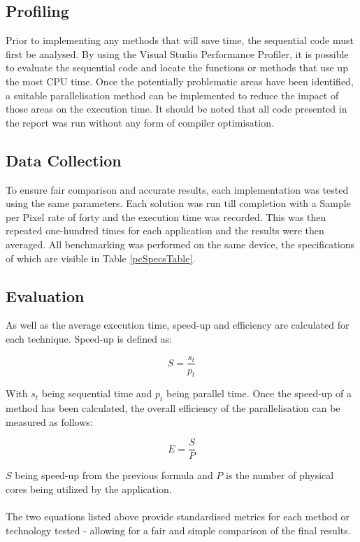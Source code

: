 \documentclass[journal,transmag]{IEEEtran}
\begin{document}
	\subsection{Profiling}
		Prior to implementing any methods that will save time, the sequential code must first be analysed. By using the Visual Studio Performance Profiler, it is possible to evaluate the sequential code and locate the functions or methods that use up the most CPU time. Once the potentially problematic areas have been identified, a suitable parallelisation method can be implemented to reduce the impact of those areas on the execution time. It should be noted that all code presented in the report was run without any form of compiler optimisation.
		
	\subsection{Data Collection}
		To ensure fair comparison and accurate results, each implementation was tested using the same parameters. Each solution was run till completion with a Sample per Pixel rate of forty and the execution time was recorded. This was then repeated one-hundred times for each application and the results were then averaged. All benchmarking was performed on the same device, the specifications of which are visible in Table \ref{pcSpecsTable}. 
		
	\subsection{Evaluation}
		As well as the average execution time, speed-up and efficiency are calculated for each technique. Speed-up is defined as: 
		
		\[S=\frac{s_{t}}{p_{t}}\]
		
		\noindent With \(s_{t}\) being sequential time and \(p_{t}\) being parallel time.
		Once the speed-up of a method has been calculated, the overall efficiency of the parallelisation can be measured as follows:
		
		\[E = \frac{S}{P}\]
		
		\noindent \(S\) being speed-up from the previous formula and \(P\) is the number of physical cores being utilized by the application.
		\\\\The two equations listed above provide standardised metrics for each method or technology tested - allowing for a fair and simple comparison of the final results.
		
\end{document}

